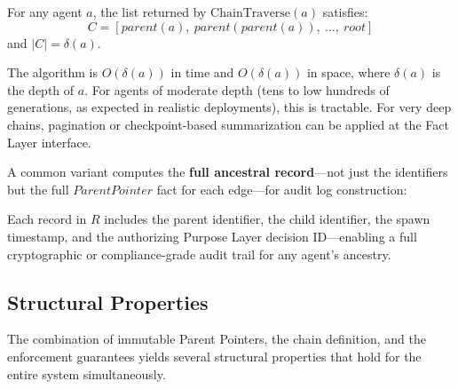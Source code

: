 \begin{property}
\label{prop:traversal-correct}
For any agent $a$, the list returned by $\text{ChainTraverse}(a)$ satisfies:
\[
C = [parent(a),\ parent(parent(a)),\ \ldots,\ root]
\]
and $|C| = \delta(a)$.
\end{property}

The algorithm is $O(\delta(a))$ in time and $O(\delta(a))$ in space, where $\delta(a)$ is the depth of $a$. For agents of moderate depth (tens to low hundreds of generations, as expected in realistic deployments), this is tractable. For very deep chains, pagination or checkpoint-based summarization can be applied at the Fact Layer interface.

A common variant computes the \textbf{full ancestral record}—not just the identifiers but the full $ParentPointer$ fact for each edge—for audit log construction:

\begin{algorithm}
\label{alg:chain-audit}
\begin{algorithmorithmic}
\Require{Agent identifier $a$, Fact Layer interface $\mathcal{F}$
\Ensure{List of $ParentPointer$ fact records from $a$ to root}

\Procedure{FullChainAudit}{$a$}
    \State $R \gets \text{empty list}$
    \State $current \gets a$
    \While{$current \neq root$}
        \State $ptr \gets \mathcal{F}.\text{query\_pointer\_fact}(current)$
        \Comment{Returns the $ParentPointer(p, current)$ record with metadata}
        \State $\text{append}(R, ptr)$
        \State $current \gets ptr.parent$
    \EndWhile
    \State \Return{$R$}
\EndProcedure
\end{algorithmorithmic}
\end{algorithm}

Each record in $R$ includes the parent identifier, the child identifier, the spawn timestamp, and the authorizing Purpose Layer decision ID—enabling a full cryptographic or compliance-grade audit trail for any agent's ancestry.

\subsection{Structural Properties}

The combination of immutable Parent Pointers, the chain definition, and the enforcement guarantees yields several structural properties that hold for the entire system simultaneously.

